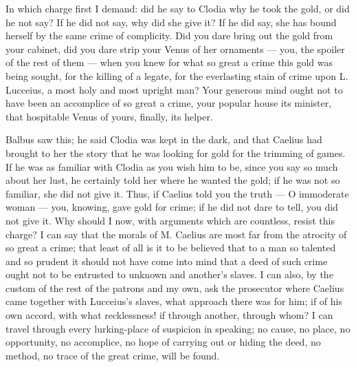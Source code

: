  In which charge first I demand: did he say to Clodia why he took the gold, or did he not say? If he did not say, why did she give it? If he did say, she has bound herself by the same crime of complicity. Did you dare bring out the gold from your cabinet, did you dare strip your Venus of her ornaments --- you, the spoiler of the rest of them --- when you knew for what so great a crime this gold was being sought, for the killing of a legate, for the everlasting stain of crime upon L. Lucceius, a most holy and most upright man? Your generous mind ought not to have been an accomplice of so great a crime, your popular house its minister, that hospitable Venus of yours, finally, its helper.

 Balbus saw this; he said Clodia was kept in the dark, and that Caelius had brought to her the story that he was looking for gold for the trimming of games. If he was as familiar with Clodia as you wish him to be, since you say so much about her lust, he certainly told her where he wanted the gold; if he was not so familiar, she did not give it. Thus, if Caelius told you the truth --- O immoderate woman --- you, knowing, gave gold for crime; if he did not dare to tell, you did not give it. Why should I now, with arguments which are countless, resist this charge? I can say that the morals of M. Caelius are most far from the atrocity of so great a crime; that least of all is it to be believed that to a man so talented and so prudent it should not have come into mind that a deed of such crime ought not to be entrusted to unknown and another's slaves. I can also, by the custom of the rest of the patrons and my own, ask the prosecutor where Caelius came together with Lucceius's slaves, what approach there was for him; if of his own accord, with what recklessness! if through another, through whom? I can travel through every lurking-place of suspicion in speaking; no cause, no place, no opportunity, no accomplice, no hope of carrying out or hiding the deed, no method, no trace of the great crime, will be found.

